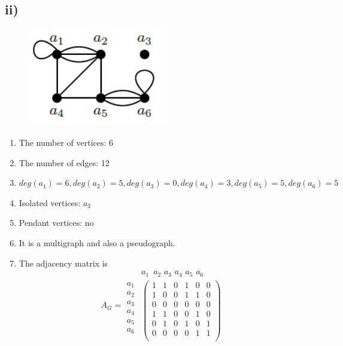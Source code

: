 \documentclass[a4paper,12pt,titlepage]{article}
\begin{document}
\subsection*{ii)}
\begin{figure}[H]
    \centering
    \includegraphics[width=6cm]{2.png}
\end{figure}
\begin{enumerate}
\item The number of vertices: 6
\item The number of edges: 12
\item $deg(a_1)=6,deg(a_2)=5,deg(a_3)=0,deg(a_4)=3,deg(a_5)=5,deg(a_6)=5$

\item Isolated vertices: $a_3$
\item Pendant vertices: no
\item It is a multigraph and also a pseudograph.
\item The adjacency matrix is
\begin{equation*} 
A_G=\begin{array}{c}
\\
a_1\\
a_2\\
a_3\\
a_4\\
a_5\\
a_6
\end{array} 
\begin{array}{c}   
    a_1\,\,\, a_2 \,\, a_3 \,\, a_4 \,\, a_5 \,\, a_6 \\
  \left(                 
  \begin{array}{cccccc}   
    1 & 1 & 0 & 1 & 0 & 0\\  
    1 & 0 & 0 & 1 & 1 & 0\\
    0 & 0 & 0 & 0 & 0 & 0\\
    1 & 1 & 0 & 0 & 1 & 0\\
    0 & 1 & 0 & 1 & 0 & 1\\
    0 & 0 & 0 & 0 & 1 & 1\\
  \end{array}
\right)  
\end{array}   
\end{equation*}
\end{enumerate}
\end{document}
